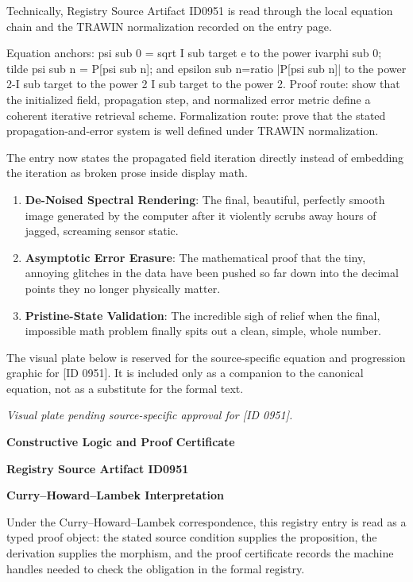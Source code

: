 Technically, Registry Source Artifact ID0951 is read through the local equation chain and the TRAWIN normalization recorded on the entry page.

Equation anchors: psi sub 0 = sqrt I sub target e to the power ivarphi sub 0; tilde psi sub n = P[psi sub n]; and epsilon sub n=ratio |P[psi sub n]| to the power 2-I sub target to the power 2 I sub target to the power 2. Proof route: show that the initialized field, propagation step, and normalized error metric define a coherent iterative retrieval scheme. Formalization route: prove that the stated propagation-and-error system is well defined under TRAWIN normalization.

The entry now states the propagated field iteration directly instead of embedding the iteration as broken prose inside display math.
\endgroup

\begin{enumerate}[leftmargin=1.6em,itemsep=6pt,topsep=4pt]
\item \textbf{De-Noised Spectral Rendering}: The final, beautiful, perfectly smooth image generated by the computer after it violently scrubs away hours of jagged, screaming sensor static.
\item \textbf{Asymptotic Error Erasure}: The mathematical proof that the tiny, annoying glitches in the data have been pushed so far down into the decimal points they no longer physically matter.
\item \textbf{Pristine-State Validation}: The incredible sigh of relief when the final, impossible math problem finally spits out a clean, simple, whole number.
\end{enumerate}

\begingroup\footnotesize\sloppy
The visual plate below is reserved for the source-specific equation and progression graphic for [ID 0951]. It is included only as a companion to the canonical equation, not as a substitute for the formal text.
\par\endgroup
\begingroup\footnotesize\itshape
Visual plate pending source-specific approval for [ID 0951].
\par\endgroup

\clearpage
\begingroup\tzpsupportsetup
\noindent\textbf{\fontsize{10.8pt}{12.8pt}\selectfont [ID 0951] Constructive Logic and Proof Certificate}\par
\noindent\textbf{\fontsize{10pt}{12pt}\selectfont Registry Source Artifact ID0951}\par
\vspace{0.45em}
\begingroup
\footnotesize
\setlength{\parskip}{0.22em}
\setlength{\parindent}{0pt}
\noindent\textbf{Curry--Howard--Lambek Interpretation}\par
Under the Curry--Howard--Lambek correspondence, this registry entry is read as a typed proof
object: the stated source condition supplies the proposition, the derivation supplies the
morphism, and the proof certificate records the machine handles needed to check the obligation
in the formal registry.

